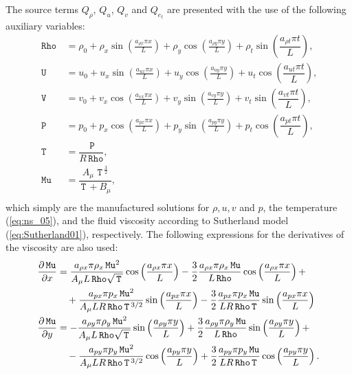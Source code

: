 \documentclass[10pt]{article}
\newcommand{\diff}[2] {\dfrac{\partial #1}{\partial #2}}
\newcommand{\Rho}{\,\mathtt{Rho}}
\newcommand{\PP}{\,\mathtt{P}}
\newcommand{\U}{\,\mathtt{U}}
\newcommand{\V}{\,\mathtt{V}}
\newcommand{\Mu}{\,\mathtt{Mu}}
\newcommand{\T}{\,\mathtt{T}\,}
\newcommand{\DMuDx}{\diff{\Mu}{x}}
\newcommand{\DMuDy}{\diff{\Mu}{y}}
\begin{document}
The source terms $Q_\rho$, $Q_u$, $Q_v$ and $Q_{e_t}$ are  presented with the use of the following auxiliary variables:\begin{equation}
 \begin{split}
\label{eq:aux_01}
\Rho \, &= \rho_{0}+ \rho_{x} \sin\left(\frac{a_{ \rho  x} \pi x}{L}\right)+ \rho_{y} \cos\left(\frac{a_{ \rho  y} \pi y}{L}\right) +  \rho_t \sin\left(\dfrac{a_{\rho t} \pi t}{L}\right),\\
%
\U&=u_{0}+u_{x} \sin\left(\frac{a_{u  x} \pi x}{L}\right)+u_{y} \cos\left(\frac{a_{u  y} \pi y}{L}\right)+ u_t \cos\left(\dfrac{a_{u t} \pi t}{L}\right) ,\\
%
\V \, &= v_{0}+v_{x} \cos\left(\frac{a_{v  x} \pi x}{L}\right)+v_{y} \sin\left(\frac{a_{v  y} \pi y}{L}\right)+ v_t \sin\left(\dfrac{a_{v t} \pi t}{L}\right), \\
%
\PP \, &= p_{0}+p_{x} \cos\left(\frac{a_{p  x} \pi x}{L}\right)+p_{y} \sin\left(\frac{a_{p  y} \pi y}{L}\right)+ p_t \cos\left(\dfrac{a_{p t} \pi t}{L}\right),\\
\T&= \dfrac{\PP}{R\Rho},\\
\Mu  &=\dfrac{A_\mu \, \T^{\frac{3}{2}}}{\T+B_\mu},\\
\end{split}
\end{equation}
which simply are the manufactured solutions for $\rho, u, v$ and $p$, the temperature (\ref{eq:ns_05}), and  the fluid viscosity according to Sutherland model (\ref{eq:Sutherland01}), respectively. The following expressions for the derivatives of the viscosity are also used:
\begin{equation}
\begin{split}\label{eq:aux_02}
\DMuDx &= \dfrac{a_{\rho x} \pi \rho_x \Mu^2 }{A_{\mu} L \Rho \sqrt{\T}}\cos\left(\dfrac{a_{\rho x} \pi x}{L}\right)-\dfrac{3}{2} \dfrac{a_{\rho x} \pi \rho_x \Mu }{L \Rho}\cos\left(\dfrac{a_{\rho x} \pi x}{L}\right) + \\ 
&\quad+\dfrac{a_{px} \pi p_x \Mu^2 }{A_{\mu} L R \Rho \T^{3/2}}\sin\left(\dfrac{a_{px} \pi x}{L}\right)-\dfrac{3}{2} \dfrac{a_{px} \pi p_x \Mu }{L R \Rho \T}\sin\left(\dfrac{a_{px} \pi x}{L}\right)\\ \vspace{15pt}
%
\DMuDy &= -\dfrac{a_{\rho y} \pi \rho_y \Mu^2 }{A_{\mu} L \Rho \sqrt{\T}}\sin\left(\dfrac{a_{\rho y} \pi y}{L}\right)+\dfrac{3}{2} \dfrac{a_{\rho y} \pi \rho_y \Mu }{L \Rho}\sin\left(\dfrac{a_{\rho y} \pi y}{L}\right) + \\ 
&\quad-\dfrac{a_{py} \pi p_y \Mu^2 }{A_{\mu} L R \Rho \T^{3/2}}\cos\left(\dfrac{a_{py} \pi y}{L}\right)+\dfrac{3}{2} \dfrac{a_{py} \pi p_y \Mu }{L R \Rho \T}\cos\left(\dfrac{a_{py} \pi y}{L}\right).
\end{split}
\end{equation}
\end{document}
